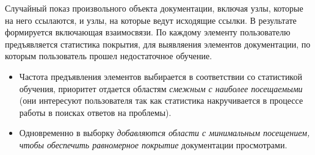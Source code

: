 \label{lrnkarlo}

\clearpage
Случайный показ произвольного объекта документации, включая узлы, которые на
него ссылаются, и узлы, на которые ведут исходящие ссылки. В результате
формируется  включающая взаимосвязи.
По каждому элементу пользователю предъявляется статистика покрытия, для
выявляения элементов документации, по которым пользователь прошел недостаточное
обучение.

\begin{itemize}
  \item 
Частота предъявления элементов выбирается в соответствии со статистикой
обучения, приоритет отдается областям \emph{смежным с наиболее посещаемыми} (они
интересуют пользователя так как статистика накручивается в процессе работы в
поисках ответов на проблемы).
  \item 
Одновременно в выборку \emph{добавляются области с
минимальным посещением, чтобы обеспечить равномерное покрытие} документации
просмотрами.
\end{itemize}
